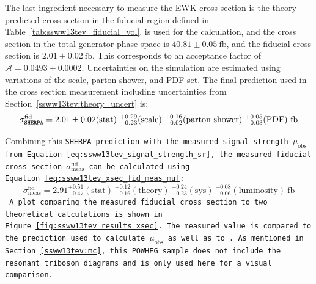The last ingredient necessary to measure the \ssww EWK cross section is the theory predicted cross section in the fiducial region defined in Table~\ref{tab:ssww13tev_fiducial_vol}.
 is used for the calculation, and the cross section in the total generator phase space is $40.81\pm 0.05~\textrm{fb}$, and the fiducial cross section is $2.01\pm 0.02~\textrm{fb}$.
This corresponds to an acceptance factor of $\mathcal{A} = 0.0493\pm 0.0002$.
Uncertainties on the simulation are estimated using variations of the scale, parton shower, and PDF set.
The final prediction used in the cross section measurement including uncertainties from Section~\ref{ssww13tev:theory_uncert} is:
\begin{equation}
  \sigma_{\tt{SHERPA}}^{\textrm{fid}} = 2.01 \pm 0.02(\textrm{stat})~^{+0.29}_{-0.23} (\textrm{scale})~^{+0.16}_{-0.02}(\textrm{parton shower})~^{+0.05}_{-0.03} (\textrm{PDF})~\textrm{fb}
  \label{eq:ssww13tev_fiducial_xsec_theory}
\end{equation}

Combining this \tt{SHERPA} prediction with the measured signal strength $\mu_{\textrm{obs}}$ from Equation~\ref{eq:ssww13tev_signal_strength_sr}, the measured fiducial cross section $\sigma_{\textrm{meas}}^{\textrm{fid}}$ can be calculated using Equation~\ref{eq:ssww13tev_xsec_fid_meas_mu}:
\begin{equation}
  \sigma_{\textrm{meas}}^{\textrm{fid}} = 2.91^{+0.51}_{-0.47}(\textrm{stat})~^{+0.12}_{-0.16}(\textrm{theory})~^{+0.24}_{-0.23}(\textrm{sys})~^{+0.08}_{-0.06}(\textrm{luminosity})~\textrm{fb}
  \label{eq:ssww13tev_fiducial_xsec}
\end{equation}
A plot comparing the measured fiducial cross section to two theoretical calculations is shown in Figure~\ref{fig:ssww13tev_results_xsec}.
The measured value is compared to the  prediction used to calculate $\mu_{\textrm{obs}}$ as well as to .
As mentioned in Section~\ref{ssww13tev:mc}, this \tt{POWHEG} sample does not include the resonant triboson diagrams and is only used here for a visual comparison.

